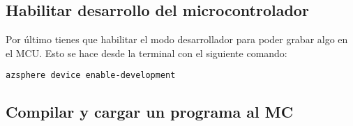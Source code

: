 \subsection{Habilitar desarrollo del microcontrolador}
Por último tienes que habilitar el modo desarrollador para poder grabar algo en el MCU. Esto se hace desde la terminal con el siguiente comando:
\begin{verbatim}
azsphere device enable-development
\end{verbatim}

\subsection{Compilar y cargar un programa al MC}
